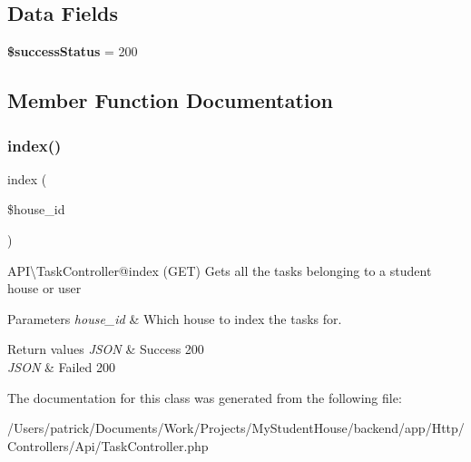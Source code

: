 \subsection*{Data Fields}
\begin{DoxyCompactItemize}
\item 
\mbox{\label{class_app_1_1_http_1_1_controllers_1_1_api_1_1_task_controller_a4fde01aada3b602338d7002a598a8763}} 
{\bfseries \$success\+Status} = 200
\end{DoxyCompactItemize}


\subsection{Member Function Documentation}
\mbox{\label{class_app_1_1_http_1_1_controllers_1_1_api_1_1_task_controller_a03e28cc4ace81818bfa12c56ea253809}} 
\subsubsection{\texorpdfstring{index()}{index()}}
{\footnotesize\ttfamily index (\begin{DoxyParamCaption}\item[{}]{\$house\+\_\+id }\end{DoxyParamCaption})}

\begin{DoxyParagraph}{A\+PI\textbackslash{}\+Task\+Controller@index (G\+ET)}
Gets all the tasks belonging to a student house or user
\end{DoxyParagraph}

\begin{DoxyParams}{Parameters}
{\em house\+\_\+id} & Which house to index the tasks for.\\
\hline
\end{DoxyParams}

\begin{DoxyRetVals}{Return values}
{\em J\+S\+ON} & Success 200 \\
\hline
{\em J\+S\+ON} & Failed 200 \\
\hline
\end{DoxyRetVals}


The documentation for this class was generated from the following file\+:\begin{DoxyCompactItemize}
\item 
/\+Users/patrick/\+Documents/\+Work/\+Projects/\+My\+Student\+House/backend/app/\+Http/\+Controllers/\+Api/Task\+Controller.\+php\end{DoxyCompactItemize}
